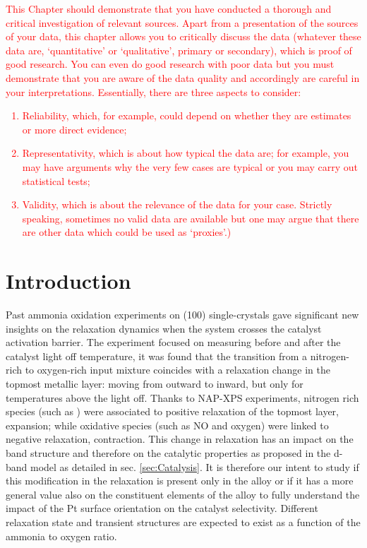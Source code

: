 \textcolor{red}{This Chapter should demonstrate that you have conducted a thorough and critical investigation of relevant sources.
Apart from a presentation of the sources of your data, this chapter allows you to critically discuss the data (whatever these data are, ‘quantitative’ or ‘qualitative’, primary or secondary), which is proof of good research. You can even do good research with poor data but you must demonstrate that you are aware of the data quality and accordingly are careful in your interpretations. Essentially, there are three aspects to consider:
\begin{enumerate}
\item   Reliability, which, for example, could depend on whether they are estimates or more direct evidence;
\item   Representativity, which is about how typical the data are; for example, you may have arguments why the very few cases are typical or you may carry out statistical tests;
\item Validity, which is about the relevance of the data for your case. Strictly speaking, sometimes no valid data are available but one may argue that there are other data which could be used as ‘proxies’.)
\end{enumerate}
}

\section{Introduction}

Past ammonia oxidation experiments on  (100) \parencite{Resta2020a} single-crystals gave significant new insights on the relaxation dynamics when the system crosses the catalyst activation barrier.
The experiment focused on measuring before and after the catalyst light off temperature, it was found that the transition from a nitrogen-rich to oxygen-rich input mixture coincides with a relaxation change in the topmost metallic layer: moving from outward to inward, but only for temperatures above the light off.
Thanks to NAP-XPS experiments, nitrogen rich species (such as \nitrogen) were associated to positive relaxation of the topmost layer, expansion; while oxidative species (such as NO and oxygen) were linked to negative relaxation, contraction.
This change in relaxation has an impact on the band structure and therefore on the catalytic properties as proposed in the d-band model as detailed in sec. \ref{sec:Catalysis}.
It is therefore our intent to study if this modification in the relaxation is present only in the  alloy or if it has a more general value also on the constituent elements of the alloy to fully understand the impact of the Pt surface orientation on the catalyst selectivity.
Different relaxation state and transient structures are expected to exist as a function of the ammonia to oxygen ratio.

